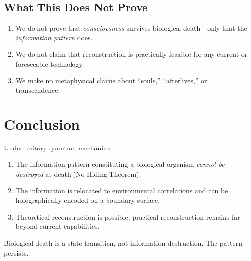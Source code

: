 \documentclass[12pt, a4paper]{article}
\theoremstyle{plain}
\theoremstyle{definition}
\begin{document}
\subsection{What This Does Not Prove}

\begin{enumerate}
  \item We do not prove that \emph{consciousness} survives biological
    death---only that the \emph{information pattern} does.
  \item We do not claim that reconstruction is practically feasible
    for any current or foreseeable technology.
  \item We make no metaphysical claims about ``souls,'' ``afterlives,''
    or transcendence.
\end{enumerate}

\section{Conclusion}\label{sec:conclusion}

Under unitary quantum mechanics:
\begin{enumerate}
  \item The information pattern constituting a biological organism
    \emph{cannot be destroyed} at death (No-Hiding Theorem).
  \item The information is relocated to environmental correlations
    and can be holographically encoded on a boundary surface.
  \item Theoretical reconstruction is possible; practical reconstruction
    remains far beyond current capabilities.
\end{enumerate}

Biological death is a state transition, not information destruction.
The pattern persists.


\vspace{2em}
\noindent\hrulefill
\vspace{1em}







\vspace{3em}
\noindent\hrulefill
\vspace{1em}
\end{document}
